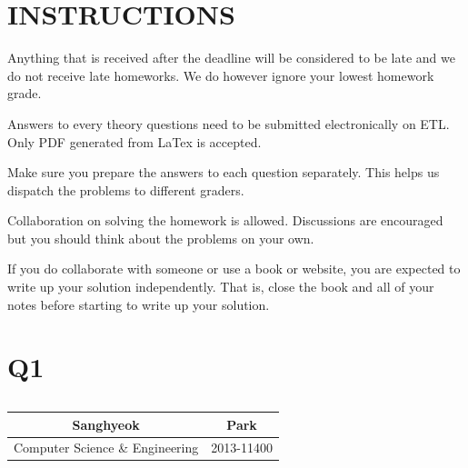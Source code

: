 \documentclass{article}
\begin{document}
\pagestyle{fancy}

\section*{INSTRUCTIONS}

\begin{itemize*}
\item Anything
  that is received after the deadline will be considered to be late and we do not receive late homeworks. We do however ignore your lowest homework grade. 
\item Answers to every theory questions need to be submitted
  electronically on ETL. Only PDF generated from LaTex is accepted.
\item Make sure you prepare the answers to each question
  separately. This helps us dispatch the problems to different graders.
\item Collaboration on solving the homework is allowed. Discussions
  are encouraged but you should think about the problems on your own. 
\item If you do collaborate with someone or use a book or website, you
  are expected to write up your solution independently.  That is,
  close the book and all of your notes before starting to write up
  your solution. 
\end{itemize*}


\section{Q1}

\subsection{}
\begin{center}
	\begin{tabular}{| c | c |}
		\hline
        Sanghyeok & Park \\ \hline
        Computer Science \& Engineering & 2013-11400 \\
		\hline
	\end{tabular}
\end{center}
\end{document}

